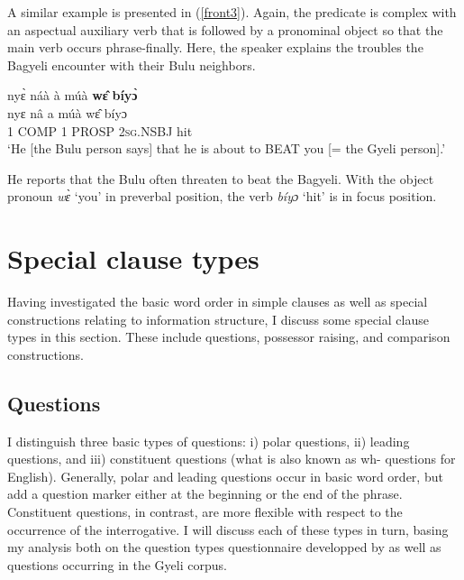 A similar example is presented in (\ref{front3}). Again, the predicate is complex with an aspectual auxiliary verb that is followed by a pronominal object so that the main verb occurs phrase-finally. Here, the speaker explains the troubles the Bagyeli encounter with their Bulu neighbors.

\begin{exe} 
\ex\label{front3}
  \glll  nyɛ̀ náà à múà {\bfseries wɛ̂} {\bfseries bíyɔ̀} \\
        nyɛ nâ a múà wɛ̂ bíyɔ \\
           1 COMP 1 PROSP 2\textsc{sg}.NSBJ hit \\
    \trans `He [the Bulu person says] that he is about to BEAT you [= the Gyeli person].'
\end{exe}

\noindent He reports that the Bulu often threaten to beat the Bagyeli. With the object pronoun {\itshape wɛ̀} `you' in preverbal position, the verb {\itshape bíyɔ} `hit' is in focus position.








\section{Special clause types}
\label{sec:specialC}

Having investigated the basic word order in simple clauses as well as special constructions relating to information structure, I discuss some special clause types in this section. These include questions, possessor raising, and comparison constructions. 

\subsection{Questions}
\label{sec:Questions}

I distinguish three basic types of questions: i) polar questions, ii) leading questions, and iii) constituent questions (what is also known as wh- questions for English). Generally, polar and leading questions occur in basic word order, but add a question marker either at the beginning or the end of the phrase. Constituent questions, in contrast, are more flexible with respect to the occurrence of the interrogative. I will discuss each of these types in turn,
basing my analysis both on the question types questionnaire developped by \citet{patin2011} as well as questions occurring in the Gyeli corpus.

